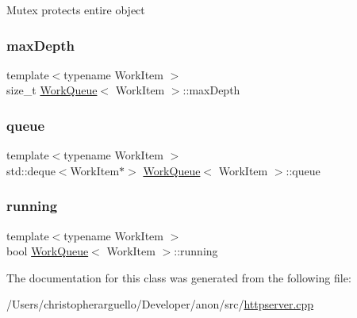 Mutex protects entire object \mbox{\label{class_work_queue_a9be06784f8d48f7d20bed3ffef363824}} 
\subsubsection{\texorpdfstring{max\+Depth}{maxDepth}}
{\footnotesize\ttfamily template$<$typename Work\+Item $>$ \\
size\+\_\+t \mbox{\hyperlink{class_work_queue}{Work\+Queue}}$<$ Work\+Item $>$\+::max\+Depth\hspace{0.3cm}{\ttfamily [private]}}

\mbox{\label{class_work_queue_a73a474d4e815d2c4741004a935bc28f6}} 
\subsubsection{\texorpdfstring{queue}{queue}}
{\footnotesize\ttfamily template$<$typename Work\+Item $>$ \\
std\+::deque$<$Work\+Item$\ast$$>$ \mbox{\hyperlink{class_work_queue}{Work\+Queue}}$<$ Work\+Item $>$\+::queue\hspace{0.3cm}{\ttfamily [private]}}

\mbox{\label{class_work_queue_a54f7b8e284f663a4b25c82bae0434eb9}} 
\subsubsection{\texorpdfstring{running}{running}}
{\footnotesize\ttfamily template$<$typename Work\+Item $>$ \\
bool \mbox{\hyperlink{class_work_queue}{Work\+Queue}}$<$ Work\+Item $>$\+::running\hspace{0.3cm}{\ttfamily [private]}}



The documentation for this class was generated from the following file\+:\begin{DoxyCompactItemize}
\item 
/\+Users/christopherarguello/\+Developer/anon/src/\mbox{\hyperlink{httpserver_8cpp}{httpserver.\+cpp}}\end{DoxyCompactItemize}
